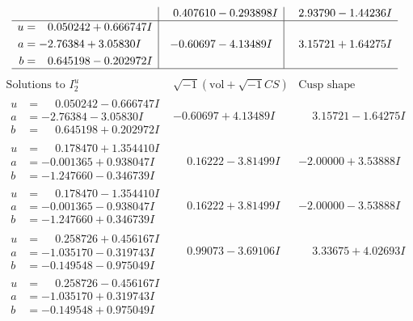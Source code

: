 \documentclass[1p]{elsarticle_modified}
\theoremstyle{definition}
\newcommand{\I}{\sqrt{-1}}
\begin{document}
$$\begin{array}{c|c|c}
 & \phantom{-}0.407610 - 0.293898 I & \phantom{-}2.93790 - 1.44236 I \\ \hline\begin{aligned}
u &= \phantom{-}0.050242 + 0.666747 I \\
a &= -2.76384 + 3.05830 I \\
b &= \phantom{-}0.645198 - 0.202972 I\end{aligned}
 & -0.60697 - 4.13489 I & \phantom{-}3.15721 + 1.64275 I\\
 \hline 
 \end{array}$$\newpage$$\begin{array}{c|c|c}  
\text{Solutions to }I^u_{2}& \I (\text{vol} + \sqrt{-1}CS) & \text{Cusp shape}\\
 \hline 
\begin{aligned}
u &= \phantom{-}0.050242 - 0.666747 I \\
a &= -2.76384 - 3.05830 I \\
b &= \phantom{-}0.645198 + 0.202972 I\end{aligned}
 & -0.60697 + 4.13489 I & \phantom{-}3.15721 - 1.64275 I \\ \hline\begin{aligned}
u &= \phantom{-}0.178470 + 1.354410 I \\
a &= -0.001365 + 0.938047 I \\
b &= -1.247660 - 0.346739 I\end{aligned}
 & \phantom{-}0.16222 - 3.81499 I & -2.00000 + 3.53888 I \\ \hline\begin{aligned}
u &= \phantom{-}0.178470 - 1.354410 I \\
a &= -0.001365 - 0.938047 I \\
b &= -1.247660 + 0.346739 I\end{aligned}
 & \phantom{-}0.16222 + 3.81499 I & -2.00000 - 3.53888 I \\ \hline\begin{aligned}
u &= \phantom{-}0.258726 + 0.456167 I \\
a &= -1.035170 - 0.319743 I \\
b &= -0.149548 - 0.975049 I\end{aligned}
 & \phantom{-}0.99073 - 3.69106 I & \phantom{-}3.33675 + 4.02693 I \\ \hline\begin{aligned}
u &= \phantom{-}0.258726 - 0.456167 I \\
a &= -1.035170 + 0.319743 I \\
b &= -0.149548 + 0.975049 I\end{aligned}

\end{array}$$
\end{document}
